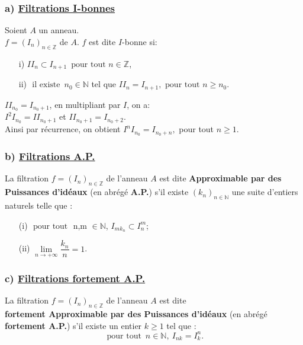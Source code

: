 \subsubsection{a) \underline{Filtrations I-bonnes}} 
\begin{madefinition}
	Soient $A$ un anneau.\\
	$f = (I_n)_{n \in \mathbb{Z}}$ de $A$. $f$ est dite $I$-bonne si:
	\begin{enumerate}
		\item[i)]$ II_n \subset I_{n+1} \, \text{ pour tout } n \in \mathbb{Z}$,
		\item[ii)]$\text{ il existe } \, n_0 \in \mathbb{N}$ tel que $II_n = I_{n+1}, \text{ pour tout } n \geqslant n_0.$
	\end{enumerate}
\end{madefinition}
\begin{maconsequence}
	$II_{n_0} = I_{n_{0}+1}$, en multipliant par $I$, on a:\\ $I^{2}I_{n_0} = II_{n_{0}+1}$ et $II_{n_0+1} = I_{n_{0}+2}$. \\
	Ainsi par récurrence, on obtient $I^{n}I_{n_0} = I_{n_{0}+n},$ pour tout $n \geqslant 1$. 
\end{maconsequence}
\subsubsection{b) \underline{Filtrations A.P.}}
\begin{madefinition}
	La filtration $f = (I_n)_{n \in \mathbb{Z}}$ de l'anneau $A$ est dite \textbf{Approximable par des Puissances d'idéaux} (en abrégé \textbf{A.P.}) s'il existe $(k_{n})_{n \in \mathbb{N}}$ une suite d'entiers naturels telle que :
	\begin{enumerate}
		\item[(i)] $\text{ pour tout }$ n,m $\in \mathbb{N}$, $I_{mk_n} \subset I_n^{m}$;
		\item[(ii)] $\underset{n\longrightarrow +\infty }{\lim }\dfrac{k_{n}}{n}=1$.
	\end{enumerate}
\end{madefinition}
\subsubsection{c) \underline{Filtrations fortement A.P.}}
\begin{madefinition}
	La filtration $f = (I_n)_{n \in \mathbb{Z}}$ de l'anneau $A$ est dite \\ \textbf{fortement Approximable par des Puissances d'idéaux} (en abrégé \textbf{fortement A.P.}) s'il existe un entier $k \geqslant 1$ tel que :
	\[ \text{ pour tout } \, n \in \mathbb{N}, \ I_{nk} = I_k^n. \]
\end{madefinition}
